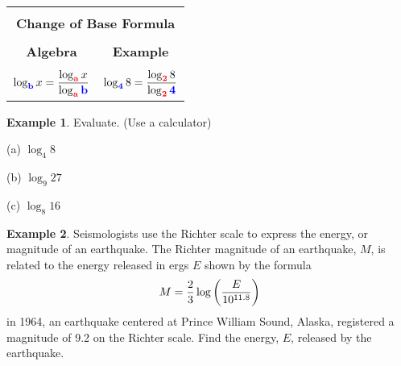 \documentclass{report}
\theoremstyle{definition}
\newtheorem{example}{\bf Example}
\begin{document}
\begin{center}
	\large
	\begin{tabular}[t]{|c|c|}
		\hline
		\multicolumn{2}{|c|}{}\\
		\multicolumn{2}{|c|}{\textbf{Change of Base Formula}\large}\\
		\hline
		&\\
		\qquad\qquad  \textbf{Algebra} \qquad\qquad\qquad & \qquad\qquad \textbf{Example} \qquad\qquad\qquad\\
		\hline
		&\\
		$\log_{\color{blue}\mathbf{b}\color{black}} x = \displaystyle\frac{\log_{\color{red}\mathbf{a}\color{black}} x}{\log_{\color{red}\mathbf{a}\color{black}} {\color{blue}\mathbf{b}\color{black}}}$ 
		&
		$\log_{\color{blue}\mathbf{4}\color{black}} 8 = \displaystyle\frac{\log_{\color{red}\mathbf{2}\color{black}} 8}{\log_{\color{red}\mathbf{2}\color{black}} {\color{blue}\mathbf{4}\color{black}}}$\\
		\hline
	\end{tabular}
	\normalsize
\end{center}


\begin{example}
Evaluate. (Use a calculator)
\end{example}

\begin{minipage}[t]{0.45\linewidth}
	 (a) $\log_4 8$
\end{minipage}
\hfill
\begin{minipage}[t]{0.45\linewidth}
 	(b) $\log_9 27$
\end{minipage}
\hfill
\begin{minipage}[t]{0.45\linewidth}
	 (c) $\log_8 16$
\end{minipage}
\vfill

\begin{example}
Seismologists use the Richter scale to express the energy, or magnitude of an earthquake. The Richter magnitude of an earthquake, $M$, is related to the energy released in ergs $E$ shown by the formula 
\[M = \frac{2}{3}\log\bigg{(} \frac{E}{10^{11.8}} \bigg{)}\]
in 1964, an earthquake centered at Prince William Sound, Alaska, registered a magnitude of 9.2 on the Richter scale. Find the energy, $E$, released by the earthquake.
\end{example}



\vfill
 \noindent{}
 \newpage
\end{document}
